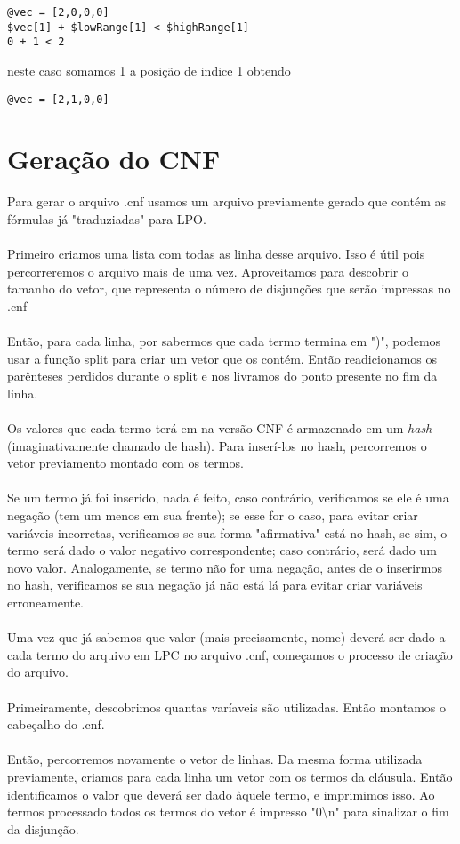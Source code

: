 \documentclass[a4paper]{article}
\begin{document}
\begin{verbatim} 
@vec = [2,0,0,0] 
$vec[1] + $lowRange[1] < $highRange[1]
0 + 1 < 2
\end{verbatim}
neste caso somamos 1 a posição de indice 1 obtendo
\begin{verbatim} 
@vec = [2,1,0,0] 
\end{verbatim}





\section{Geração do CNF}
Para gerar o arquivo .cnf usamos um arquivo previamente gerado que contém as fórmulas já "traduziadas" para LPO.\\\\
Primeiro criamos uma lista com todas as linha desse arquivo. Isso é útil pois percorreremos o arquivo mais de uma vez. Aproveitamos para descobrir o tamanho do vetor, que representa o número de disjunções que serão impressas no .cnf\\\\
Então, para cada linha, por sabermos que cada termo termina em ")", podemos usar a função split para criar um vetor que os contém. Então readicionamos os parênteses perdidos durante o split e nos livramos do ponto presente no fim da linha.\\\\
Os valores que cada termo terá em na versão CNF é armazenado em um \textit{hash} (imaginativamente chamado de hash). Para inserí-los no hash, percorremos o vetor previamento montado com os termos.\\\\ Se um termo já foi inserido, nada é feito, caso contrário, verificamos se ele é uma negação (tem um menos em sua frente); se esse for o caso, para evitar criar variáveis incorretas, verificamos se sua forma "afirmativa" está no hash, se sim, o termo será dado o valor negativo correspondente; caso contrário, será dado um novo valor. Analogamente, se termo não for uma negação, antes de o inserirmos no hash, verificamos se sua negação já não está lá para evitar criar variáveis erroneamente.\\\\
Uma vez que já sabemos que valor (mais precisamente, nome) deverá ser dado a cada termo do arquivo em LPC no arquivo .cnf, começamos o processo de criação do arquivo.\\\\
Primeiramente, descobrimos quantas varíaveis são utilizadas. Então montamos o cabeçalho do .cnf.\\\\
Então, percorremos novamente o vetor de linhas. Da mesma forma utilizada previamente, criamos para cada linha um vetor com os termos da cláusula. Então identificamos o valor que deverá ser dado àquele termo, e imprimimos isso. Ao termos processado todos os termos do vetor é impresso "0\textbackslash n" para sinalizar o fim da disjunção.
\end{document}
